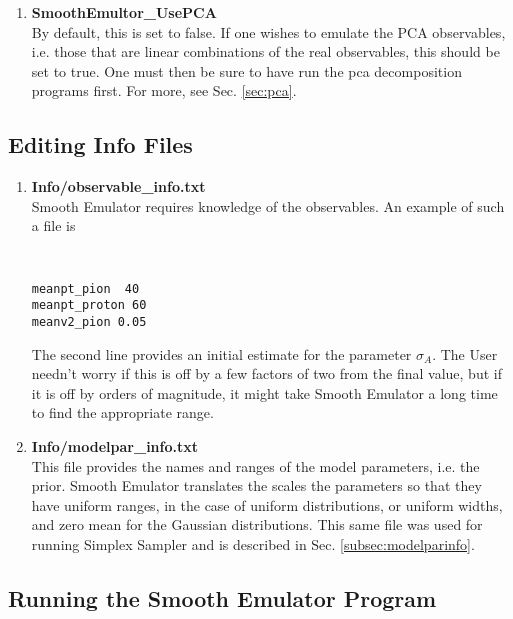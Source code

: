 \documentclass[main.tex]{subfiles}
\begin{document}
\begin{enumerate}
\item {\bf SmoothEmultor\_UsePCA}\\
By default, this is set to false. If one wishes to emulate the PCA observables, i.e. those that are linear combinations of the real observables, this should be set to true. One must then be sure to have run the pca decomposition programs first. For more, see Sec. \ref{sec:pca}. 

\end{enumerate}


\subsection{Editing Info Files}

\begin{enumerate}

\item {\bf Info/observable\_info.txt}\\
Smooth Emulator requires knowledge of the observables. An example of such a file is
{\tt
\begin{verbatim}
meanpt_pion  40
meanpt_proton 60
meanv2_pion 0.05
\end{verbatim}
}
The second line provides an initial estimate for the parameter $\sigma_A$. The User needn't worry if this is off by a few factors of two from the final value, but if it is off by orders of magnitude, it might take Smooth Emulator a long time to find the appropriate range.

\item {\bf Info/modelpar\_info.txt}\\
This file provides the names and ranges of the model parameters, i.e. the prior. Smooth Emulator translates the scales the parameters so that they have uniform ranges, in the case of uniform distributions, or uniform widths, and zero mean for the Gaussian distributions. This same file was used for running Simplex Sampler and is described in Sec. \ref{subsec:modelparinfo}. 

\end{enumerate}

\subsection{Running the Smooth Emulator Program}
\end{document}
